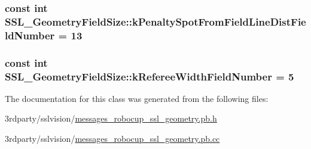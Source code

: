 \hypertarget{class_s_s_l___geometry_field_size_ad271545218157092602fcaf767cc64a6}{
\subsubsection[{k\-Penalty\-Spot\-From\-Field\-Line\-Dist\-Field\-Number}]{\setlength{\rightskip}{0pt plus 5cm}const int S\-S\-L\-\_\-\-Geometry\-Field\-Size\-::k\-Penalty\-Spot\-From\-Field\-Line\-Dist\-Field\-Number = 13\hspace{0.3cm}{\ttfamily [static]}}}\label{class_s_s_l___geometry_field_size_ad271545218157092602fcaf767cc64a6}
\hypertarget{class_s_s_l___geometry_field_size_acdeb5d084b614878d1fbbea839c64e32}{
\subsubsection[{k\-Referee\-Width\-Field\-Number}]{\setlength{\rightskip}{0pt plus 5cm}const int S\-S\-L\-\_\-\-Geometry\-Field\-Size\-::k\-Referee\-Width\-Field\-Number = 5\hspace{0.3cm}{\ttfamily [static]}}}\label{class_s_s_l___geometry_field_size_acdeb5d084b614878d1fbbea839c64e32}


The documentation for this class was generated from the following files\-:\begin{DoxyCompactItemize}
\item 
3rdparty/sslvision/\hyperlink{messages__robocup__ssl__geometry_8pb_8h}{messages\-\_\-robocup\-\_\-ssl\-\_\-geometry.\-pb.\-h}\item 
3rdparty/sslvision/\hyperlink{messages__robocup__ssl__geometry_8pb_8cc}{messages\-\_\-robocup\-\_\-ssl\-\_\-geometry.\-pb.\-cc}\end{DoxyCompactItemize}
